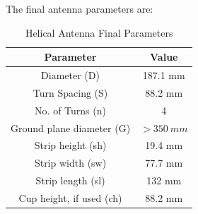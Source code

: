 \newpage
The final antenna parameters are:
\begin{table}[!htb]
  \centering
  \renewcommand{\arraystretch}{1.2}
  \begin{tabular}{ |c|c| }
  \hline
  \textbf{Parameter}                  & \textbf{Value}    \\
  \hline
  Diameter (D)                        & 187.1 mm          \\ \hline
  Turn Spacing (S)                    & 88.2 mm           \\ \hline
  No. of Turns (n)                    & 4                 \\ \hline
  Ground plane diameter (G)           & $> \SI{350}{mm}$  \\ \hline
  Strip height (sh)                   & 19.4 mm          \\ \hline
  Strip width (sw)                    & 77.7 mm           \\ \hline
  Strip length (sl)                   & 132 mm           \\ \hline
  Cup height, if used (ch)            & 88.2 mm           \\ \hline
  \end{tabular}
  \caption{Helical Antenna Final Parameters}
  \label{tab:helicalParameters}
\end{table}
